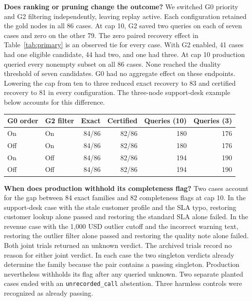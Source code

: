 \documentclass[11pt,letterpaper]{article}
\begin{document}
\textbf{Does ranking or pruning change the outcome?} We switched G0 priority and G2 filtering independently, leaving replay active. Each configuration retained the gold nodes in all 86 cases. At cap 10, G2 saved two queries on each of seven cases and zero on the other 79. The zero paired recovery effect in Table~\ref{tab:primary} is an observed tie for every case. With G2 enabled, 41 cases had one eligible candidate, 44 had two, and one had three. At cap 10 production queried every nonempty subset on all 86 cases. None reached the duality threshold of seven candidates. G0 had no aggregate effect on these endpoints. Lowering the cap from ten to three reduced exact recovery to 83 and certified recovery to 81 in every configuration. The three-node support-desk example below accounts for this difference.

\begin{center}\begin{minipage}{\linewidth}\centering
{}\label{tab:gates}
\small\begin{tabular}{llrrrr}
\toprule
G0 order & G2 filter & Exact & Certified & Queries (10) & Queries (3) \\
\midrule
On & On & 84/86 & 82/86 & 180 & 176 \\
Off & On & 84/86 & 82/86 & 180 & 176 \\
On & Off & 84/86 & 82/86 & 194 & 190 \\
Off & Off & 84/86 & 82/86 & 194 & 190 \\
\bottomrule\end{tabular}
\end{minipage}\end{center}

\textbf{When does production withhold its completeness flag?} Two cases account for the gap between 84 exact families and 82 completeness flags at cap 10. In the support-desk case with the stale customer profile and the SLA typo, restoring customer lookup alone passed and restoring the standard SLA alone failed. In the revenue case with the 1,000 USD outlier cutoff and the incorrect warning text, restoring the outlier filter alone passed and restoring the quality note alone failed. Both joint trials returned an unknown verdict. The archived trials record no reason for either joint verdict. In each case the two singleton verdicts already determine the family because the pair contains a passing singleton. Production nevertheless withholds its flag after any queried unknown. Two separate planted cases ended with an \texttt{unrecorded\_call} abstention. Three harmless controls were recognized as already passing.
\end{document}

